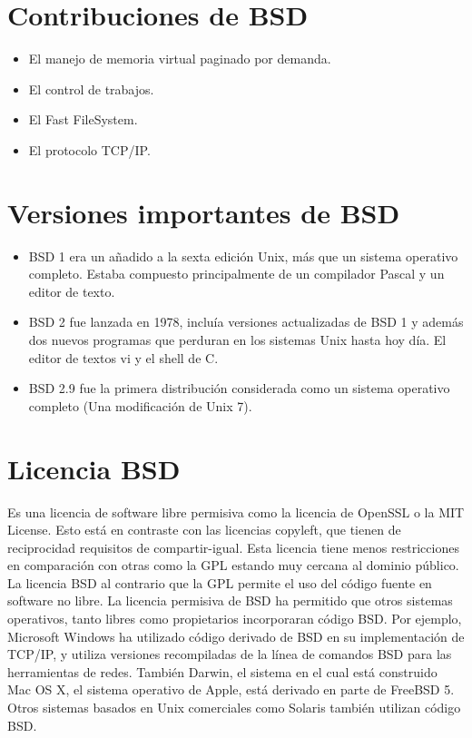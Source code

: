 \section{Contribuciones de BSD}

\begin{itemize}
	\item El manejo de memoria virtual paginado por demanda.
	\item El control de trabajos.
	\item El Fast FileSystem.
	\item El protocolo TCP/IP.
\end{itemize}

\section{Versiones importantes de BSD}

\begin{itemize}
	\item BSD 1 era un añadido a la sexta edición Unix, más que un sistema operativo completo. Estaba compuesto principalmente de un compilador Pascal y un editor de texto.
	\item BSD 2 fue lanzada en 1978, incluía versiones actualizadas de BSD 1 y además dos nuevos programas que perduran en los sistemas Unix hasta hoy día. El editor de textos vi y el shell de C.
	\item BSD 2.9 fue la primera distribución considerada como un sistema operativo completo (Una modificación de Unix 7).
\end{itemize}

\section{Licencia BSD}

 Es una licencia de software libre permisiva como la licencia de OpenSSL o la MIT License. Esto está en contraste con las licencias copyleft, que tienen de reciprocidad requisitos de compartir-igual. Esta licencia tiene menos restricciones en comparación con otras como la GPL estando muy cercana al dominio público. La licencia BSD al contrario que la GPL permite el uso del código fuente en software no libre.
 La licencia permisiva de BSD ha permitido que otros sistemas operativos, tanto libres como propietarios incorporaran código BSD. Por ejemplo, Microsoft Windows ha utilizado código derivado de BSD en su implementación de TCP/IP, y utiliza versiones recompiladas de la línea de comandos BSD para las herramientas de redes. También Darwin, el sistema en el cual está construido Mac OS X, el sistema operativo de Apple, está derivado en parte de FreeBSD 5. Otros sistemas basados en Unix comerciales como Solaris también utilizan código BSD.
 
